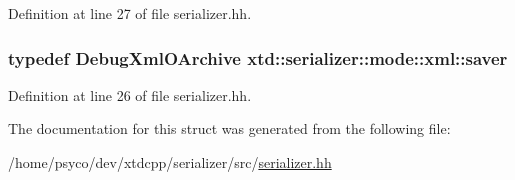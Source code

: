 Definition at line 27 of file serializer.\+hh.

\subsubsection[{\texorpdfstring{saver}{saver}}]{\setlength{\rightskip}{0pt plus 5cm}typedef {\bf Debug\+Xml\+O\+Archive} {\bf xtd\+::serializer\+::mode\+::xml\+::saver}}\hypertarget{structxtd_1_1serializer_1_1mode_1_1xml_a630743906b9808c209a9d7bce84427bc}{}\label{structxtd_1_1serializer_1_1mode_1_1xml_a630743906b9808c209a9d7bce84427bc}


Definition at line 26 of file serializer.\+hh.



The documentation for this struct was generated from the following file\+:\begin{DoxyCompactItemize}
\item 
/home/psyco/dev/xtdcpp/serializer/src/\hyperlink{serializer_8hh}{serializer.\+hh}\end{DoxyCompactItemize}
